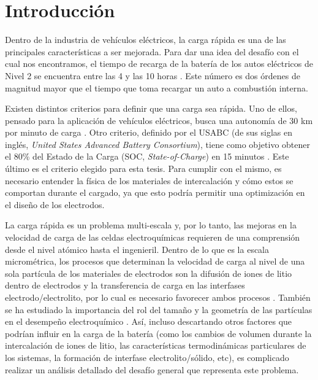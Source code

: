 \section{Introducción}

Dentro de la industria de vehículos eléctricos, la carga rápida es una de las principales características a ser 
mejorada. Para dar una idea del desafío con el cual nos encontramos, el tiempo 
de recarga de la batería de los autos eléctricos de Nivel 2 se encuentra entre 
las 4 y las 10 horas \cite{evcs}. Este número es dos órdenes de magnitud 
mayor que el tiempo que toma recargar un auto a combustión interna.

Existen distintos criterios para definir que una carga sea rápida. Uno de ellos, 
pensado para la aplicación de vehículos eléctricos, busca una autonomía de 30 km 
por minuto de carga \cite{dufek2022}. Otro criterio, definido por el USABC (de sus
siglas en inglés, \textit{United States Advanced Battery Consortium}), tiene como
objetivo obtener el 80\% del Estado de la Carga (SOC, \textit{State-of-Charge})
en 15 minutos \cite{USABC}. Este último es el criterio elegido para esta tesis.
Para cumplir con el mismo, es necesario entender la física de los materiales de
intercalación y cómo estos se comportan durante el cargado, ya que esto podría 
permitir una optimización en el diseño de los electrodos.

La carga rápida es un problema multi-escala \cite{franco2013, franco2019} y, por 
lo tanto, las mejoras en la velocidad de carga de las celdas electroquímicas 
requieren de una comprensión desde el nivel atómico hasta el ingenieril. Dentro 
de lo que es la escala micrométrica, los procesos que determinan la velocidad de 
carga al nivel de una sola partícula de los materiales de electrodos son la 
difusión de iones de litio dentro de electrodos y la transferencia de carga en 
las interfases electrodo/electrolito, por lo cual es necesario favorecer ambos
procesos \cite{liu2019, tomaszewska2019, weiss2021}. También se ha estudiado la 
importancia del rol del tamaño y la geometría de las partículas en el desempeño 
electroquímico \cite{gavilan2020, gavilan2022}. Así, incluso descartando
otros factores que podrían influir en la carga de la batería (como los cambios de 
volumen durante la intercalación de iones de litio, las características termodinámicas particulares
de los sistemas, la formación de interfase electrolito/sólido, etc), es complicado
realizar un análisis detallado del desafío general que representa este problema.

